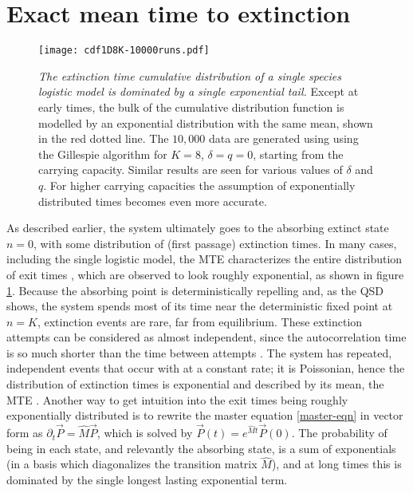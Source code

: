 \section{Exact mean time to extinction}%

\begin{figure}[h]
	\centering
	\texttt{[image: cdf1D8K-10000runs.pdf]}
	\caption{\emph{The extinction time cumulative distribution of a single species logistic model is dominated by a single exponential tail.} 
	Except at early times, the bulk of the cumulative distribution function is modelled by an exponential distribution with the same mean, shown in the red dotted line. 
	The $10,000$ data are generated using using the Gillespie algorithm for $K=8$, $\delta=q=0$, starting from the carrying capacity. Similar results are seen for various values of $\delta$ and $q$. For higher carrying capacities the assumption of exponentially distributed times becomes even more accurate. 
	} \label{etimedistr}
\end{figure}

As described earlier, the system ultimately goes to the absorbing extinct state $n=0$, with some distribution of (first passage) extinction times. %
In many cases, including the single logistic model, the MTE characterizes the entire distribution of exit times \cite{Hanggi1990,Bel2010}, which are observed to look roughly exponential, as shown in figure \ref{etimedistr}.  
Because the absorbing point is deterministically repelling and, as the QSD shows, the system spends most of its time near the deterministic fixed point at $n=K$, extinction events are rare, far from equilibrium. %
These extinction attempts can be considered as almost independent, since the autocorrelation time is so much shorter than the time between attempts \cite{Hanggi1990,Lande1993}. %
The system has repeated, independent events that occur with at a constant rate; it is Poissonian, hence the distribution of extinction times is exponential and described by its mean, the MTE \cite{Hanggi1990,Leigh1981,Lande1993,Foley1994}. 
Another way to get intuition into the exit times being roughly exponentially distributed is to rewrite the master equation \ref{master-eqn} in vector form as $\partial_t \vec{P} = \hat{M}\vec{P}$, which is solved by $\vec{P}(t)=e^{\hat{M}t}\vec{P}(0)$. 
The probability of being in each state, and relevantly the absorbing state, is a sum of exponentials (in a basis which diagonalizes the transition matrix $\hat{M}$), and at long times this is dominated by the single longest lasting exponential term. 

